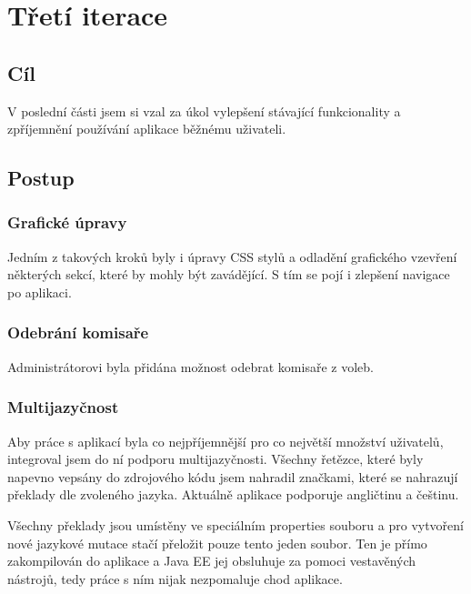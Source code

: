\documentclass[11pt,twoside,a4paper]{book}
\begin{document}
\section{Třetí iterace}

\subsection{Cíl}

V poslední části jsem si vzal za úkol vylepšení stávající funkcionality a zpříjemnění používání aplikace běžnému uživateli.

\subsection{Postup}

\subsubsection{Grafické úpravy}

Jedním z takových kroků byly i úpravy CSS stylů a odladění grafického vzevření některých sekcí, které by mohly být zavádějící. S tím se pojí i zlepšení navigace po aplikaci.

\subsubsection{Odebrání komisaře}

Administrátorovi byla přidána možnost odebrat komisaře z voleb.

\subsubsection{Multijazyčnost}

Aby práce s aplikací byla co nejpříjemnější pro co největší množství uživatelů, integroval jsem do ní podporu multijazyčnosti. Všechny řetězce, které byly napevno vepsány do zdrojového kódu jsem nahradil značkami, které se nahrazují překlady dle zvoleného jazyka. Aktuálně aplikace podporuje angličtinu a češtinu. 

Všechny překlady jsou umístěny ve speciálním properties souboru a pro vytvoření nové jazykové mutace stačí přeložit pouze tento jeden soubor. Ten je přímo zakompilován do aplikace a Java EE jej obsluhuje za pomoci vestavěných nástrojů, tedy práce s ním nijak nezpomaluje chod aplikace.
\end{document}
